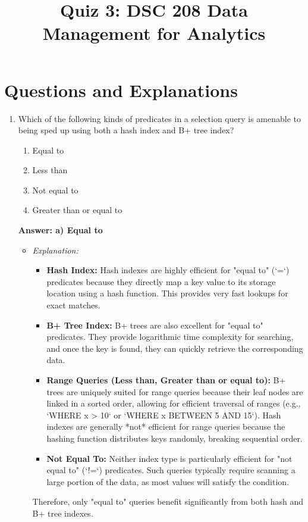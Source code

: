 \documentclass{article}
\title{Quiz 3: DSC 208 Data Management for Analytics}
\author{}
\date{}
\begin{document}
\maketitle

\section*{Questions and Explanations}

\begin{enumerate}[label=\textbf{Question \arabic*.}]

\item Which of the following kinds of predicates in a selection query is amenable to being sped up using both a hash index and B+ tree index?
    \begin{enumerate}[label=\alph*)]
        \item Equal to
        \item Less than
        \item Not equal to
        \item Greater than or equal to
    \end{enumerate}
    \textbf{Answer: a) Equal to}
    \begin{itemize}
        \item \textit{Explanation:}
        \begin{itemize}
            \item \textbf{Hash Index:} Hash indexes are highly efficient for "equal to" (`=`) predicates because they directly map a key value to its storage location using a hash function. This provides very fast lookups for exact matches.
            \item \textbf{B+ Tree Index:} B+ trees are also excellent for "equal to" predicates. They provide logarithmic time complexity for searching, and once the key is found, they can quickly retrieve the corresponding data.
            \item \textbf{Range Queries (Less than, Greater than or equal to):} B+ trees are uniquely suited for range queries because their leaf nodes are linked in a sorted order, allowing for efficient traversal of ranges (e.g., `WHERE x > 10` or `WHERE x BETWEEN 5 AND 15`). Hash indexes are generally *not* efficient for range queries because the hashing function distributes keys randomly, breaking sequential order.
            \item \textbf{Not Equal To:} Neither index type is particularly efficient for "not equal to" (`!=`) predicates. Such queries typically require scanning a large portion of the data, as most values will satisfy the condition.
        \end{itemize}
        Therefore, only "equal to" queries benefit significantly from both hash and B+ tree indexes.
    \end{itemize}


\end{enumerate}
\end{document}
